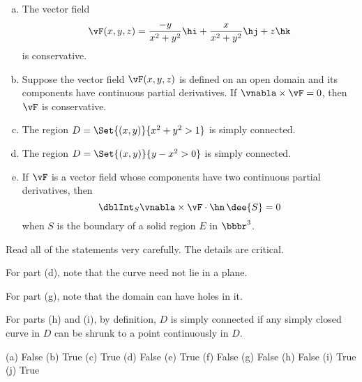 \begin{question}[M317 2008A]
\begin{enumerate}[(a)]
\item
The vector field
\begin{equation*}
\vF(x, y, z) = \frac{-y}{x^2+y^2} \hi 
               + \frac{x}{x^2+y^2} \hj
               + z\hk
\end{equation*}
is conservative.

\item
Suppose the vector field $\vF(x, y, z)$ is defined on an open domain 
and its components have continuous partial derivatives. If 
$\vnabla\times\vF = 0$, then $\vF$ is conservative.

\item
The region $D = \Set{ (x, y) }{ x^2 + y^2 > 1 }$ is simply connected.

\item
The region $D = \Set{ (x, y) }{ y - x^2 > 0 }$ is simply connected.

\item
If $\vF$ is a vector field whose components have two continuous 
partial derivatives, then
\begin{equation*}
\dblInt_S \vnabla\times \vF \cdot\hn\, \dee{S} = 0
\end{equation*}
when $S$ is the boundary of a solid region $E$ in $\bbbr^3$.

\end{enumerate}
\end{question}

\begin{hint} 
Read all of the statements very carefully. The details are critical.

For part (d), note that the curve need not lie in a plane.

For part (g), note that the domain can have holes in it.

For parts (h) and (i), by definition, $D$ is simply connected if 
any simply closed curve in $D$ can be shrunk to a 
point continuously in $D$.

\end{hint}

\begin{answer} 
(a) False\qquad
(b) True\qquad
(c) True\qquad
(d) False\qquad
(e) True\qquad
(f) False\qquad
(g) False\qquad
(h) False\qquad
(i) True\qquad
(j) True
\end{answer}

